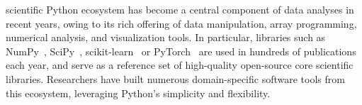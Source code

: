 \documentclass[10pt,journal,compsoc]{IEEEtran}
\begin{document}
\IEEEdisplaynontitleabstractindextext



%
\IEEEpeerreviewmaketitle




 scientific Python ecosystem has become a central component
of data analyses in recent years, owing to its rich offering of data
manipulation, array programming, numerical analysis, and visualization tools. In
particular, libraries such as NumPy~\cite{harris2020array},
SciPy~\cite{virtanen2020scipy}, scikit-learn~\cite{pedregosa2011scikit} or
PyTorch~\cite{paszke2019pytorch} are used in hundreds of publications each year,
and serve as a reference set of high-quality open-source core scientific
libraries. Researchers have built numerous domain-specific software tools from
this ecosystem, leveraging Python's simplicity and flexibility. 
\end{document}

